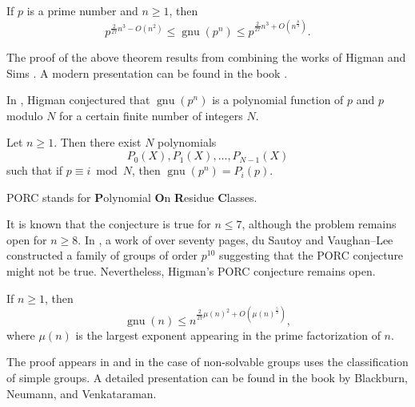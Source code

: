 \begin{theorem}
If $p$ is a prime number and $n\geq1$, then
\[
p^{\frac{2}{27}n^3-O(n^2)}\leq\operatorname{gnu}(p^n)\leq p^{\frac{2}{27}n^3+O(n^{\frac{8}{3}})}.
\]
\end{theorem}

The proof of the above theorem results from combining the works of Higman \cite{MR113948}
and Sims \cite{MR169921}. A modern presentation can be found in the book
\cite{MR2382539}.

In \cite{MR123605}, Higman conjectured that $\operatorname{gnu}(p^n)$ is a polynomial function of $p$ and $p$ modulo $N$ for a certain
finite number of integers $N$. 

\begin{conjecture}[Higman]
Let $n\geq1$. Then there exist $N$ polynomials
\[
P_{0}(X),P_{1}(X),\dots,P_{N-1}(X)
\]
such that
if $p\equiv i\bmod N$, then $\operatorname{gnu}(p^n)=P_{i}(p)$.
\end{conjecture}

PORC stands for \textbf{P}olynomial \textbf{O}n \textbf{R}esidue \textbf{C}lasses.

It is known that the conjecture is true for $n\leq7$, although the problem remains open for $n\geq8$.
In \cite{MR2921623}, a work of over seventy pages,
du Sautoy and Vaughan--Lee constructed a family of groups
of order $p^{10}$ suggesting that the PORC conjecture might not be true. Nevertheless, Higman's PORC conjecture remains open.

\begin{theorem}[Pyber]
If $n\geq1$, then
\[
\operatorname{gnu}(n)\leq n^{\frac{2}{27}\mu(n)^2+O\left(\mu(n)^{\frac{5}{3}}\right)},
\]
where $\mu(n)$ is the largest exponent
appearing in the prime factorization of $n$.
\end{theorem}

The proof appears in \cite{MR1200081} and in the case of non-solvable groups uses the classification of simple groups. A detailed presentation can be found in the book
\cite{MR2382539} by Blackburn, Neumann, and Venkataraman.
